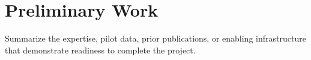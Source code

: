\section{Preliminary Work}

Summarize the expertise, pilot data, prior publications, or enabling
infrastructure that demonstrate readiness to complete the project.

